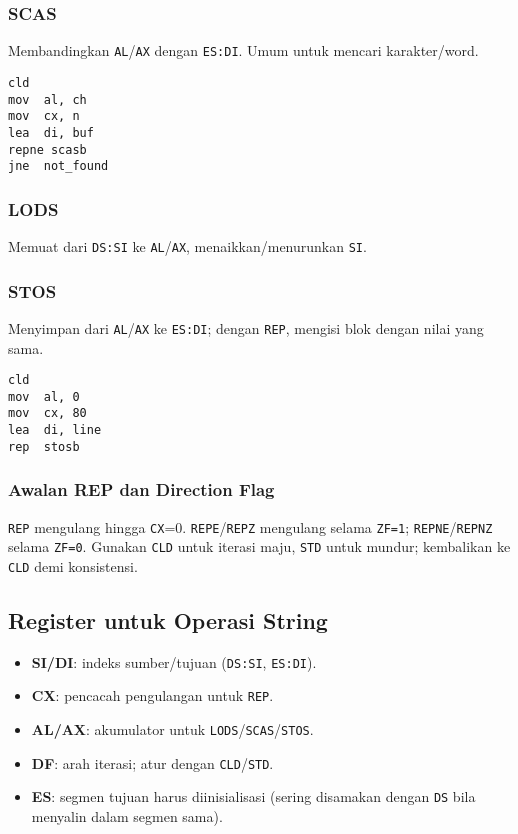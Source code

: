 \subsubsection{SCAS}
Membandingkan \texttt{AL}/\texttt{AX} dengan \texttt{ES:DI}. Umum untuk mencari karakter/word.
\begin{verbatim}
cld
mov  al, ch
mov  cx, n
lea  di, buf
repne scasb
jne  not_found
\end{verbatim}

\subsubsection{LODS}
Memuat dari \texttt{DS:SI} ke \texttt{AL}/\texttt{AX}, menaikkan/menurunkan \texttt{SI}.

\subsubsection{STOS}
Menyimpan dari \texttt{AL}/\texttt{AX} ke \texttt{ES:DI}; dengan \texttt{REP}, mengisi blok dengan nilai yang sama.
\begin{verbatim}
cld
mov  al, 0
mov  cx, 80
lea  di, line
rep  stosb
\end{verbatim}

\subsubsection{Awalan REP dan Direction Flag}
\texttt{REP} mengulang hingga \texttt{CX}=0. \texttt{REPE}/\texttt{REPZ} mengulang selama \texttt{ZF=1}; \texttt{REPNE}/\texttt{REPNZ} selama \texttt{ZF=0}. Gunakan \texttt{CLD} untuk iterasi maju, \texttt{STD} untuk mundur; kembalikan ke \texttt{CLD} demi konsistensi.

\subsection{Register untuk Operasi String}
\begin{itemize}
  \item \textbf{SI/DI}: indeks sumber/tujuan (\texttt{DS:SI}, \texttt{ES:DI}).
  \item \textbf{CX}: pencacah pengulangan untuk \texttt{REP}.
  \item \textbf{AL/AX}: akumulator untuk \texttt{LODS}/\texttt{SCAS}/\texttt{STOS}.
  \item \textbf{DF}: arah iterasi; atur dengan \texttt{CLD}/\texttt{STD}.
  \item \textbf{ES}: segmen tujuan harus diinisialisasi (sering disamakan dengan \texttt{DS} bila menyalin dalam segmen sama).
\end{itemize}


